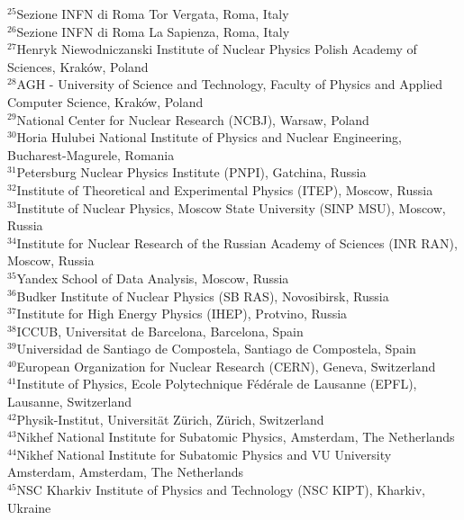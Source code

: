 \documentclass[12pt,a4paper]{article}
\begin{document}
\begin{flushleft}
{$ ^{25}$Sezione INFN di Roma Tor Vergata, Roma, Italy\\
$ ^{26}$Sezione INFN di Roma La Sapienza, Roma, Italy\\
$ ^{27}$Henryk Niewodniczanski Institute of Nuclear Physics  Polish Academy of Sciences, Krak{\'o}w, Poland\\
$ ^{28}$AGH - University of Science and Technology, Faculty of Physics and Applied Computer Science, Krak{\'o}w, Poland\\
$ ^{29}$National Center for Nuclear Research (NCBJ), Warsaw, Poland\\
$ ^{30}$Horia Hulubei National Institute of Physics and Nuclear Engineering, Bucharest-Magurele, Romania\\
$ ^{31}$Petersburg Nuclear Physics Institute (PNPI), Gatchina, Russia\\
$ ^{32}$Institute of Theoretical and Experimental Physics (ITEP), Moscow, Russia\\
$ ^{33}$Institute of Nuclear Physics, Moscow State University (SINP MSU), Moscow, Russia\\
$ ^{34}$Institute for Nuclear Research of the Russian Academy of Sciences (INR RAN), Moscow, Russia\\
$ ^{35}$Yandex School of Data Analysis, Moscow, Russia\\
$ ^{36}$Budker Institute of Nuclear Physics (SB RAS), Novosibirsk, Russia\\
$ ^{37}$Institute for High Energy Physics (IHEP), Protvino, Russia\\
$ ^{38}$ICCUB, Universitat de Barcelona, Barcelona, Spain\\
$ ^{39}$Universidad de Santiago de Compostela, Santiago de Compostela, Spain\\
$ ^{40}$European Organization for Nuclear Research (CERN), Geneva, Switzerland\\
$ ^{41}$Institute of Physics, Ecole Polytechnique  F{\'e}d{\'e}rale de Lausanne (EPFL), Lausanne, Switzerland\\
$ ^{42}$Physik-Institut, Universit{\"a}t Z{\"u}rich, Z{\"u}rich, Switzerland\\
$ ^{43}$Nikhef National Institute for Subatomic Physics, Amsterdam, The Netherlands\\
$ ^{44}$Nikhef National Institute for Subatomic Physics and VU University Amsterdam, Amsterdam, The Netherlands\\
$ ^{45}$NSC Kharkiv Institute of Physics and Technology (NSC KIPT), Kharkiv, Ukraine\\
}
\end{flushleft}
\end{document}
